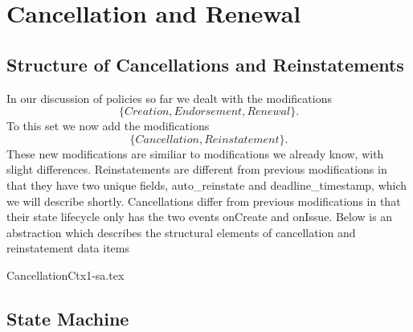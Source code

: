 \chapter{Cancellation and Renewal}
\label{intro} %


\section{Structure of Cancellations and Reinstatements}
\label{sec:02:1}
In our discussion of policies so far we dealt with the modifications
\begin{equation*}
  \{Creation, Endorsement, Renewal\}.
\end{equation*}
To this set we now
add the modifications
\begin{equation*}
  \{Cancellation, Reinstatement\}.
\end{equation*}
These new modifications are similiar to modifications we already
know, with slight differences. Reinstatements are different from previous modifications in that they have two unique
fields, auto\_reinstate and deadline\_timestamp, which we will describe shortly. Cancellations differ from previous
modifications in that their state lifecycle only has the two events onCreate and onIssue. Below is an abstraction which
describes the structural elements of cancellation and reinstatement data items

{CancellationCtx1-sa.tex}

\section{State Machine}

